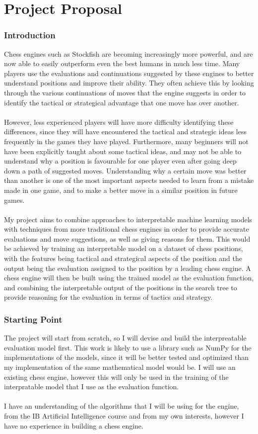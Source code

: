 \documentclass[12pt,a4paper]{article}
\begin{document}
\part*{Project Proposal}
\section*{Introduction}
Chess engines such as Stockfish are becoming increasingly more powerful, and are now able to easily outperform even the best humans in much less time. Many players use the evaluations and continuations suggested by these engines to better understand positions and improve their ability. They often achieve this by looking through the various continuations of moves that the engine suggests in order to identify the tactical or strategical advantage that one move has over another.
\\\\
However, less experienced players will have more difficulty identifying these differences, since they will have encountered the tactical and strategic ideas less frequently in the games they have played. Furthermore, many beginners will not have been explicitly taught about some tactical ideas, and may not be able to understand why a position is favourable for one player even after going deep down a path of suggested moves. Understanding why a certain move was better than another is one of the most important aspects needed to learn from a mistake made in one game, and to make a better move in a similar position in future games.
\\\\
My project aims to combine approaches to interpretable machine learning models with techniques from more traditional chess engines in order to provide accurate evaluations and move suggestions, as well as giving reasons for them. This would be achieved by training an interpretable model on a dataset of chess positions, with the features being tactical and strategical aspects of the position and the output being the evaluation assigned to the position by a leading chess engine. A chess engine will then be built using the trained model as the evaluation function, and combining the interpretable output of the positions in the search tree to provide reasoning for the evaluation in terms of tactics and strategy.

\section*{Starting Point}
The project will start from scratch, so I will devise and build the interpreatable evaluation model first. This work is likely to use a library such as NumPy for the implementations of the models, since it will be better tested and optimized than my implementation of the same mathematical model would be. I will use an existing chess engine, however this will only be used in the training of the interpratable model that I use as the evaluation function. 
\\\\
I have an understanding of the algorithms that I will be using for the engine, from the IB Artificial Intelligence course and from my own interests, however I have no experience in building a chess engine.
\end{document}
